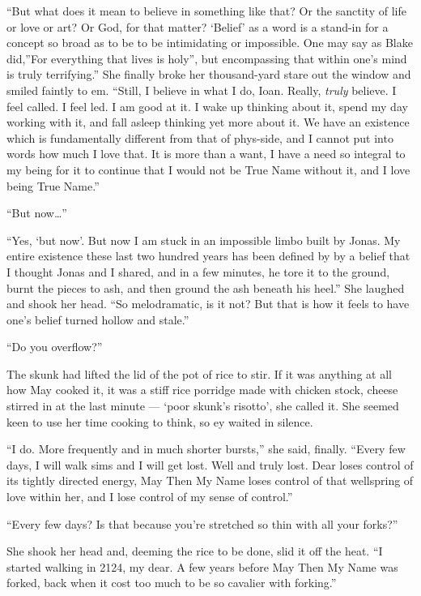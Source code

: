 ``But what does it mean to believe in something like that? Or the sanctity of life or love or art? Or God, for that matter? `Belief' as a word is a stand-in for a concept so broad as to be to be intimidating or impossible. One may say as Blake did,''For everything that lives is holy'', but encompassing that within one's mind is truly terrifying.'' She finally broke her thousand-yard stare out the window and smiled faintly to em. ``Still, I believe in what I do, Ioan. Really, \emph{truly} believe. I feel called. I feel led. I am good at it. I wake up thinking about it, spend my day working with it, and fall asleep thinking yet more about it. We have an existence which is fundamentally different from that of phys-side, and I cannot put into words how much I love that. It is more than a want, I have a need so integral to my being for it to continue that I would not be True Name without it, and I love being True Name.''

``But now\ldots{}''

``Yes, `but now'. But now I am stuck in an impossible limbo built by Jonas. My entire existence these last two hundred years has been defined by by a belief that I thought Jonas and I shared, and in a few minutes, he tore it to the ground, burnt the pieces to ash, and then ground the ash beneath his heel.'' She laughed and shook her head. ``So melodramatic, is it not? But that is how it feels to have one's belief turned hollow and stale.''

``Do you overflow?''

The skunk had lifted the lid of the pot of rice to stir. If it was anything at all how May cooked it, it was a stiff rice porridge made with chicken stock, cheese stirred in at the last minute — `poor skunk's risotto', she called it. She seemed keen to use her time cooking to think, so ey waited in silence.

``I do. More frequently and in much shorter bursts,'' she said, finally. ``Every few days, I will walk sims and I will get lost. Well and truly lost. Dear loses control of its tightly directed energy, May Then My Name loses control of that wellspring of love within her, and I lose control of my sense of control.''

``Every few days? Is that because you're stretched so thin with all your forks?''

She shook her head and, deeming the rice to be done, slid it off the heat. ``I started walking in 2124, my dear. A few years before May Then My Name was forked, back when it cost too much to be so cavalier with forking.''

